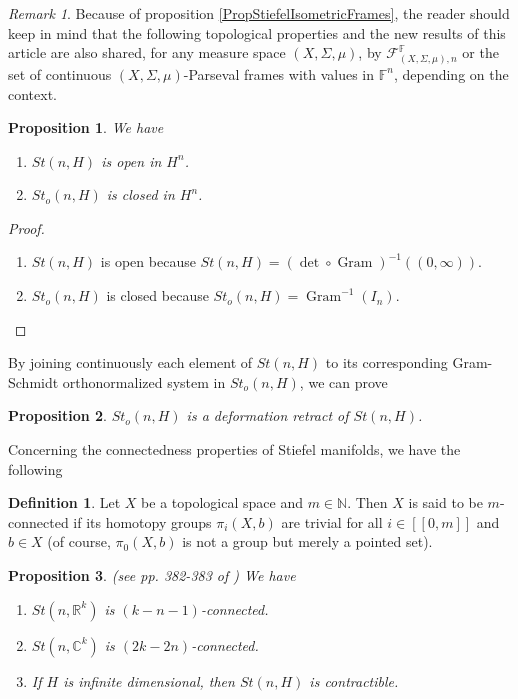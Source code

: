 \documentclass[a4paper,12pt]{article}
\DeclareMathOperator{\Gram}{Gram}
\theoremstyle{plain}
\newtheorem{proposition}{Proposition}[section]
\theoremstyle{definition}
\newtheorem{definition}{Definition}[section]
\theoremstyle{remark}
\newtheorem{remark}{Remark}[section]
\begin{document}
\begin{remark}
\label{RemarkIsometry}
Because of proposition \ref{PropStiefelIsometricFrames}, the reader should keep in mind that the following topological properties and the new results of this article are also shared, for any measure space $(X,\Sigma,\mu)$, by $\mathcal{F}_{(X,\Sigma,\mu),n}^\mathbb{F}$ or the set of continuous $(X,\Sigma,\mu)$-Parseval frames with values in $\mathbb{F}^n$, depending on the context.
\end{remark}

\begin{proposition}
\label{PropFramesOpenClosed}
We have
\begin{enumerate}
\item $St(n,H)$ is open in $H^n$.
\item $St_o(n,H)$ is closed in $H^n$.
\end{enumerate}
\end{proposition}

\begin{proof} 
\begin{enumerate}
\item $St(n,H)$ is open because $St(n,H) = (\det \circ \Gram)^{-1}((0,\infty))$.
\item $St_o(n,H)$ is closed because $St_o(n,H) = \Gram^{-1}(I_n)$.
\end{enumerate}
\end{proof}

By joining continuously each element of $St(n,H)$ to its corresponding Gram-Schmidt orthonormalized system in $St_o(n,H)$, we can prove

\begin{proposition} $St_o(n,H)$ is a deformation retract of $St(n,H)$.
\end{proposition}

Concerning the connectedness properties of Stiefel manifolds, we have the following

\begin{definition}
Let $X$ be a topological space and $m \in \mathbb{N}$. Then $X$ is said to be $m$-connected if its homotopy groups $\pi_i(X,b)$ are trivial for all $i \in [\![0,m]\!]$ and $b \in X$ (of course, $\pi_0(X,b)$ is not a group but merely a pointed set).
\end{definition}

\begin{proposition} (see pp. 382-383 of \cite{Hatcher}) We have
\begin{enumerate}
\item $St(n,\mathbb{R}^k)$ is $(k-n-1)$-connected.
\item $St(n,\mathbb{C}^k)$ is $(2k-2n)$-connected.
\item If $H$ is infinite dimensional, then $St(n,H)$ is contractible.
\end{enumerate}
\end{proposition}
\end{document}
